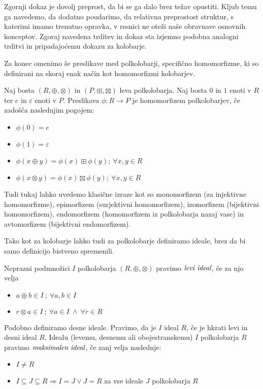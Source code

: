 \documentclass[mat1]{fmfdelo}
\newcommand{\pojem}[1]{\ensuremath{\emph{#1}}}
\newcommand{\map}[3]{\ensuremath{{#1}:{#2}\rightarrow{#3}}}
\begin{document}
Zgornji dokaz je dovolj preprost, da bi se ga dalo brez težav opustiti. Kljub temu ga navedemo, da dodatno poudarimo, da relativna preprostost struktur, s katerimi imamo trenutno opravka, v resnici ne oteži naše obravnave osnovnih konceptov. Zgoraj navedena trditev in dokaz sta izjemno podobna analogni trditvi in pripadajoćemu dokazu za kolobarje.
	
Za konec omenimo še preslikave med polkolobarji, specifično homomorfizme, ki so definirani na skoraj enak način kot homomorfizmi kolobarjev.
	
\begin{definicija}
	Naj bosta $(R, \oplus, \otimes)$ in $(P, \boxplus, \boxtimes)$ leva polkolobarja. Naj bosta $0$ in $1$ enoti v $R$ ter $e$ in $\varepsilon$ enoti v $P$. Preslikava $\map{\phi}{R}{P}$ je homomorfizem polkolobarjev, če zadošča naslednjim pogojem:
	\begin{itemize}
		\item $\phi(0) = e$
		\item $\phi(1) = \varepsilon$
		\item $\phi(x \oplus y) = \phi(x) \boxplus\phi(y) ;~\forall x, y\in R$
		\item $\phi(x \otimes y) = \phi(x) \boxtimes\phi(y) ;~\forall x, y\in R$
	\end{itemize}
\end{definicija}

Tudi tukaj lahko uvedemo klasične izraze kot so monomorfizem (za injektivne homomorfizme), epimorfizem (surjektivni homomorfizem), izomorfizem (bijektivni homomorfizem), endomorfizem (homomorfizem iz polkolobarja nazaj vase) in avtomorfizem (bijektivni endomorfizem).

Tako kot za kolobarje lahko tudi za polkolobarje definiramo ideale, brez da bi samo definicijo bistveno spremenili.

\begin{definicija}
	Neprazni podmnožici $I$ polkolobarja $(R, \oplus, \otimes)$ pravimo \pojem{levi ideal}, če za njo velja \begin{itemize}
		\item $a \oplus b \in I~;~\forall a, b\in I$
		\item $r\otimes a \in I~;~\forall a\in I~\land~\forall r\in R$ 
	\end{itemize}
	Podobno definiramo desne ideale. Pravimo, da je $I$ ideal $R$, če je hkrati levi in desni ideal $R$.
	Idealu (levemu, desnemu ali obojestranskemu) $I$ polkolobarja $R$ pravimo \pojem{maksimalen ideal}, če zanj velja naslednje: \begin{itemize}
		\item $I \neq R$
		\item $I \subseteq J \subseteq R \Rightarrow I = J \lor J = R$ za vse ideale $J$ polkolobarja $R$
	\end{itemize}
\end{definicija}
\end{document}
